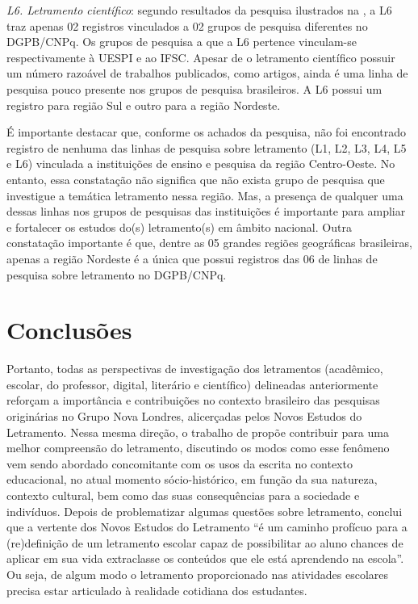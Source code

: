\documentclass{textolivre}
\begin{document}
\textit{L6. Letramento científico}: segundo resultados da pesquisa ilustrados na , a L6 traz apenas 02 registros vinculados a 02 grupos de pesquisa diferentes no DGPB/CNPq. Os grupos de pesquisa a que a L6 pertence vinculam-se respectivamente à UESPI e ao IFSC. Apesar de o letramento científico possuir um número razoável de trabalhos publicados, como artigos, ainda é uma linha de pesquisa pouco presente nos grupos de pesquisa brasileiros. A L6 possui um registro para região Sul e outro para a região Nordeste.

É importante destacar que, conforme os achados da pesquisa, não foi encontrado registro de nenhuma das linhas de pesquisa sobre letramento (L1, L2, L3, L4, L5 e L6) vinculada a instituições de ensino e pesquisa da região Centro-Oeste. No entanto, essa constatação não significa que não exista grupo de pesquisa que investigue a temática letramento nessa região. Mas, a presença de qualquer uma dessas linhas nos grupos de pesquisas das instituições é importante para ampliar e fortalecer os estudos do(s) letramento(s) em âmbito nacional. Outra constatação importante é que, dentre as 05 grandes regiões geográficas brasileiras, apenas a região Nordeste é a única que possui registros das 06 de linhas de pesquisa sobre letramento no DGPB/CNPq.

\section{Conclusões}\label{sec-conclusiones}
Portanto, todas as perspectivas de investigação dos letramentos (acadêmico, escolar, do professor, digital, literário e científico) delineadas anteriormente reforçam a importância e contribuições no contexto brasileiro das pesquisas originárias no Grupo Nova Londres, alicerçadas pelos Novos Estudos do Letramento. Nessa mesma direção, o trabalho de \textcite{terra_letramento_2013} propõe contribuir para uma melhor compreensão do letramento, discutindo os modos como esse fenômeno vem sendo abordado concomitante com os usos da escrita no contexto educacional, no atual momento sócio-histórico, em função da sua natureza, contexto cultural, bem como das suas consequências para a sociedade e indivíduos. Depois de problematizar algumas questões sobre letramento, \textcite[p. 29]{terra_letramento_2013} conclui que a vertente dos Novos Estudos do Letramento “é um caminho profícuo para a (re)definição de um letramento escolar capaz de possibilitar ao aluno chances de aplicar em sua vida extraclasse os conteúdos que ele está aprendendo na escola”. Ou seja, de algum modo o letramento proporcionado nas atividades escolares precisa estar articulado à realidade cotidiana dos estudantes.
\end{document}
